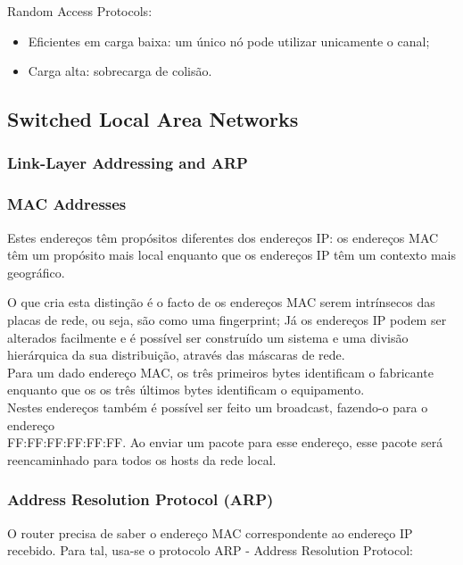 \documentclass[12pt]{article}
\begin{document}
Random Access Protocols:

\begin{itemize}[topsep=0pt, itemsep=0pt]
    \item Eficientes em carga baixa: um único nó pode utilizar unicamente o canal;
    \item Carga alta: sobrecarga de colisão.
\end{itemize}

\subsection{Switched Local Area Networks}

\subsubsection{Link-Layer Addressing and ARP}

\subsubsection*{MAC Addresses}

Estes endereços têm propósitos diferentes dos endereços IP: os endereços MAC têm um propósito mais local enquanto que os endereços IP têm um contexto mais geográfico. 

O que cria esta distinção é o facto de os endereços MAC serem intrínsecos das placas de rede, ou seja, são como uma fingerprint; Já os endereços IP podem ser alterados facilmente e é possível ser construído um sistema e uma divisão hierárquica da sua distribuição, através das máscaras de rede. \\

Para um dado endereço MAC, os três primeiros bytes identificam o fabricante enquanto que os os três últimos bytes identificam o equipamento. \\

Nestes endereços também é possível ser feito um broadcast, fazendo-o para o endereço \\ FF:FF:FF:FF:FF:FF. Ao enviar um pacote para esse endereço, esse pacote será reencaminhado para todos os hosts da rede local.

\subsubsection*{Address Resolution Protocol (ARP)}

O router precisa de saber o endereço MAC correspondente ao endereço IP recebido.
Para tal, usa-se o protocolo ARP - Address Resolution Protocol:
\end{document}

